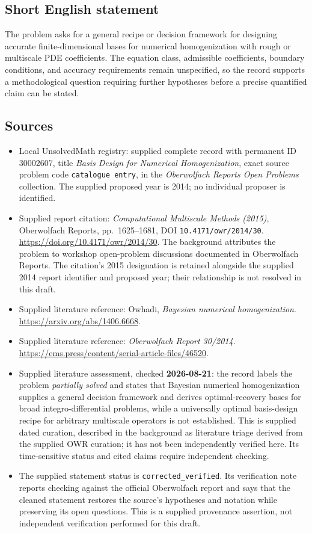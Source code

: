 \documentclass[11pt]{article}
\begin{document}
\subsection{Short English statement}
The problem asks for a general recipe or decision framework for designing accurate finite-dimensional bases for numerical homogenization with rough or multiscale PDE coefficients. The equation class, admissible coefficients, boundary conditions, and accuracy requirements remain unspecified, so the record supports a methodological question requiring further hypotheses before a precise quantified claim can be stated.
\subsection{Sources}
\begin{itemize}
\item Local UnsolvedMath registry: supplied complete record with permanent ID \(30002607\), title \emph{Basis Design for Numerical Homogenization}, exact source problem code \texttt{catalogue entry}, in the \emph{Oberwolfach Reports Open Problems} collection. The supplied proposed year is 2014; no individual proposer is identified.
\item Supplied report citation: \emph{Computational Multiscale Methods (2015)}, Oberwolfach Reports, pp.\ 1625--1681, DOI \texttt{10.4171/owr/2014/30}. \url{https://doi.org/10.4171/owr/2014/30}. The background attributes the problem to workshop open-problem discussions documented in Oberwolfach Reports. The citation's 2015 designation is retained alongside the supplied 2014 report identifier and proposed year; their relationship is not resolved in this draft.
\item Supplied literature reference: Owhadi, \emph{Bayesian numerical homogenization}. \url{https://arxiv.org/abs/1406.6668}.
\item Supplied literature reference: \emph{Oberwolfach Report 30/2014}. \url{https://ems.press/content/serial-article-files/46520}.
\item Supplied literature assessment, checked \textbf{2026-08-21}: the record labels the problem \emph{partially solved} and states that Bayesian numerical homogenization supplies a general decision framework and derives optimal-recovery bases for broad integro-differential problems, while a universally optimal basis-design recipe for arbitrary multiscale operators is not established. This is supplied dated curation, described in the background as literature triage derived from the supplied OWR curation; it has not been independently verified here. Its time-sensitive status and cited claims require independent checking.
\item The supplied statement status is \texttt{corrected\_verified}. Its verification note reports checking against the official Oberwolfach report and says that the cleaned statement restores the source's hypotheses and notation while preserving its open questions. This is a supplied provenance assertion, not independent verification performed for this draft.
\end{itemize}
\end{document}
